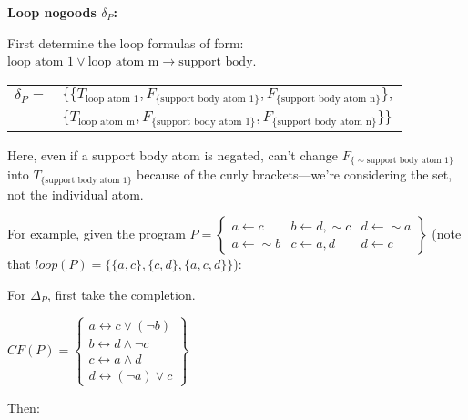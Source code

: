 \documentclass[9pt,a4paper,landscape]{article}
\newcommand{\ngtb}[1]{T_{ \{#1\} }}
\newcommand{\ngfb}[1]{F_{ \{#1\} }}
\newcommand{\ngta}[1]{T_{#1}}
\begin{document}
{\vspace{\baselineskip}
\textbf{Loop nogoods $\delta_P$:}
 
First determine the loop formulas of form: $\text{loop atom 1} \lor \text{loop atom m} \rightarrow \text{support body}$.

\begin{center}
	\begin{tabular}{rl}
		$\delta_P =$ 	& $\{ \{ \ngta{\text{loop atom 1}}, \ngfb{\text{support body atom 1}}, \ngfb{\text{support body atom n}} \},$ \\
						& $\{ \ngta{\text{loop atom m}}, \ngfb{\text{support body atom 1}}, \ngfb{\text{support body atom n}} \} \}$ \\
	\end{tabular}
\end{center}

Here, even if a support body atom is negated, can't change $\ngfb{{\sim} \text{support body atom 1}}$ into $\ngtb{\text{support body atom 1}}$ because of the curly brackets---we're considering the set, not the individual atom.

\vspace{\baselineskip}

For example, given the program $P = \left\{\begin{array}{lll}
a \leftarrow c & b \leftarrow d, {\sim} c & d \leftarrow {\sim} a\\
a \leftarrow {\sim} b & c \leftarrow a, d & d \leftarrow c
\end{array}\right\}$ (note that $loop(P) = \{ \{a, c\}, \{c, d\}, \{a, c, d\} \}$):

For $\Delta_P$, first take the completion.

\begin{center}
	$CF(P) = \left\{\begin{array}{l}
a \leftrightarrow c \lor (\neg b) \\
b \leftrightarrow d \land \neg c \\
c \leftrightarrow a \land d \\
d \leftrightarrow (\neg a) \lor c
\end{array}\right\}$
\end{center}

\pagebreak

Then:

}
\end{document}
